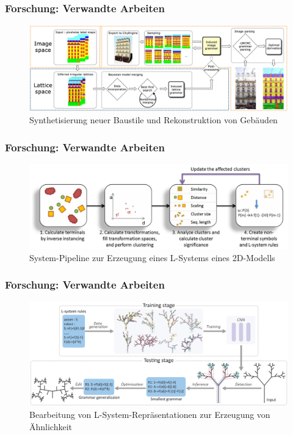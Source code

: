 \documentclass[12pt]{beamer}
\begin{document}
    \begin{frame}
        \frametitle{Forschung: Verwandte Arbeiten}

        \begin{figure}
            \centering
            \includegraphics[width=12cm]{../images/martinovic_2013_system.PNG}
            \caption{Synthetisierung neuer Baustile und Rekonstruktion von Gebäuden}
        \end{figure}
    \end{frame}

    \begin{frame}
        \frametitle{Forschung: Verwandte Arbeiten}

        \begin{figure}
            \centering
            \includegraphics[width=12cm]{../images/stava_2010_system.PNG}
            \caption{System-Pipeline zur Erzeugung eines L-Systems eines 2D-Modells}
        \end{figure}
    \end{frame}

    \begin{frame}
        \frametitle{Forschung: Verwandte Arbeiten}

        \begin{figure}
            \centering
            \includegraphics[width=12cm]{../images/guo_2020_system.PNG}
            \caption{Bearbeitung von L-System-Repräsentationen zur Erzeugung von Ähnlichkeit}
        \end{figure}
    \end{frame}
\end{document}
